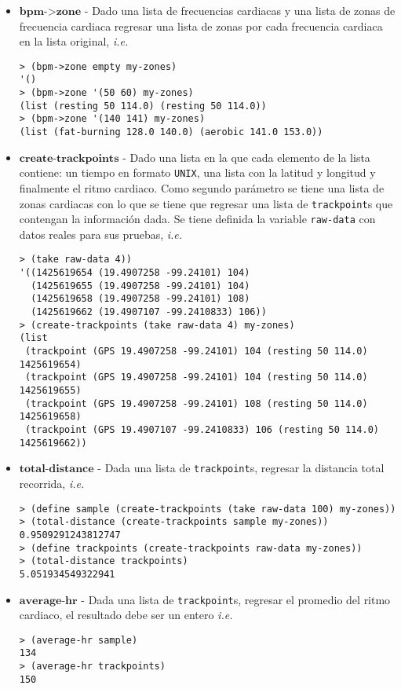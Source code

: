 \documentclass{article}
\begin{document}
\begin{itemize}
\newpage

\item $\textbf{bpm->zone}$ - Dado una lista de frecuencias cardiacas y una lista de zonas de frecuencia cardiaca regresar una lista de zonas por cada frecuencia cardiaca en la lista original, \textit{i.e.}
\begin{verbatim}
> (bpm->zone empty my-zones)
'()
> (bpm->zone '(50 60) my-zones) 
(list (resting 50 114.0) (resting 50 114.0))
> (bpm->zone '(140 141) my-zones) 
(list (fat-burning 128.0 140.0) (aerobic 141.0 153.0))
\end{verbatim}

\item $\textbf{create-trackpoints}$ - Dado una lista en la que cada elemento de la lista contiene: un tiempo en formato \verb;UNIX;, una lista con la latitud y longitud y finalmente el ritmo cardiaco. Como segundo parámetro se tiene una lista de zonas cardiacas con lo que se tiene que regresar una lista de \verb;trackpoint;s que contengan la información dada. Se tiene definida la variable \verb;raw-data; con datos reales para sus pruebas, \textit{i.e.}
\begin{verbatim}
> (take raw-data 4))
'((1425619654 (19.4907258 -99.24101) 104)
  (1425619655 (19.4907258 -99.24101) 104)
  (1425619658 (19.4907258 -99.24101) 108)
  (1425619662 (19.4907107 -99.2410833) 106))
> (create-trackpoints (take raw-data 4) my-zones)
(list
 (trackpoint (GPS 19.4907258 -99.24101) 104 (resting 50 114.0) 1425619654)
 (trackpoint (GPS 19.4907258 -99.24101) 104 (resting 50 114.0) 1425619655)
 (trackpoint (GPS 19.4907258 -99.24101) 108 (resting 50 114.0) 1425619658)
 (trackpoint (GPS 19.4907107 -99.2410833) 106 (resting 50 114.0) 1425619662))
\end{verbatim}

\item $\textbf{total-distance}$ - Dada una lista de \verb;trackpoint;s, regresar la distancia total recorrida, \textit{i.e.}
\begin{verbatim}
> (define sample (create-trackpoints (take raw-data 100) my-zones))
> (total-distance (create-trackpoints sample my-zones))
0.9509291243812747
> (define trackpoints (create-trackpoints raw-data my-zones))
> (total-distance trackpoints)
5.051934549322941
\end{verbatim}

\item $\textbf{average-hr}$ - Dada una lista de \verb;trackpoint;s, regresar el promedio del ritmo cardiaco, el resultado debe ser un entero \textit{i.e.}
\begin{verbatim}
> (average-hr sample)
134
> (average-hr trackpoints)
150
\end{verbatim}


\end{itemize}
\end{document}
